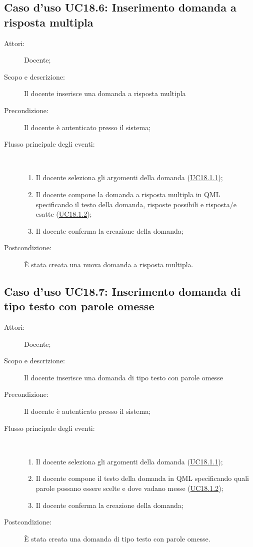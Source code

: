 \subsection{Caso d'uso UC18.6: Inserimento domanda a risposta multipla}\begin{description}
	\item[Attori:] Docente;
	\item[Scopo e descrizione:] Il docente inserisce una domanda a risposta multipla
	\item[Precondizione:] Il docente è autenticato presso il sistema;
	
	\item[Flusso principale degli eventi:] \ 
	\begin{enumerate}
		\item Il docente seleziona gli argomenti della domanda (\hyperlink{UC18.1.1}{UC18.1.1});
		\item Il docente compone la domanda a risposta multipla in QML specificando il testo della domanda, risposte possibili e risposta/e esatte (\hyperlink{UC18.1.2}{UC18.1.2});
		\item Il docente conferma la creazione della domanda;
		
	\end{enumerate}
	\item[Postcondizione:] È stata creata una nuova domanda a risposta multipla.
\end{description}
\hypertarget{UC18.7}{}
\subsection{Caso d'uso UC18.7: Inserimento domanda di tipo testo con parole omesse}\begin{description}
	\item[Attori:] Docente;
	\item[Scopo e descrizione:] Il docente inserisce una domanda di tipo testo con parole omesse
	\item[Precondizione:] Il docente è autenticato presso il sistema;
	
	\item[Flusso principale degli eventi:] \ 
	\begin{enumerate}
		\item Il docente seleziona gli argomenti della domanda (\hyperlink{UC18.1.1}{UC18.1.1});
		\item Il docente compone il testo della domanda in QML specificando quali parole possano essere scelte e dove vadano messe  (\hyperlink{UC18.1.2}{UC18.1.2});
		\item Il docente conferma la creazione della domanda;
		
	\end{enumerate}
	\item[Postcondizione:] È stata creata una domanda di tipo testo con parole omesse.
\end{description}
\hypertarget{UC18.8}{}
